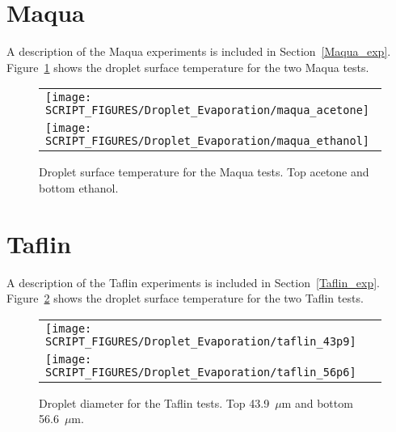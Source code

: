 \section{Maqua}

A description of the Maqua experiments is included in Section~\ref{Maqua_exp}. Figure~\ref{Maqua_plots} shows the droplet surface temperature for the two Maqua tests.

\begin{figure}[!h]
	\centering
	\begin{tabular}{l}
		\texttt{[image: SCRIPT\_FIGURES/Droplet\_Evaporation/maqua\_acetone]} \\
		\texttt{[image: SCRIPT\_FIGURES/Droplet\_Evaporation/maqua\_ethanol]}
	\end{tabular}
	\caption[Droplet surface temperture for the Maqua tests. Top acetone and bottom ethanol.]
	{Droplet surface temperature for the Maqua tests. Top acetone and bottom ethanol.}
	\label{Maqua_plots}
\end{figure}

\section{Taflin}

A description of the Taflin experiments is included in Section~\ref{Taflin_exp}. Figure~\ref{Taflin_plots} shows the droplet surface temperature for the two Taflin tests.

\begin{figure}[!h]
	\centering
	\begin{tabular}{l}
		\texttt{[image: SCRIPT\_FIGURES/Droplet\_Evaporation/taflin\_43p9]} \\
		\texttt{[image: SCRIPT\_FIGURES/Droplet\_Evaporation/taflin\_56p6]}
	\end{tabular}
	\caption[Droplet diameter for the Taflin tests. Top 43.9~$\mu$m and bottom 56.6~$\mu$m.]
	{Droplet diameter for the Taflin tests. Top 43.9~$\mu$m and bottom 56.6~$\mu$m.}
	\label{Taflin_plots}
\end{figure}



